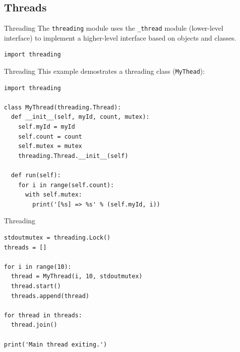 \documentclass[xcolor=dvipsnames, 10pt, presentation,aspectratio=169]{beamer}
\begin{document}
\subsection{Threads}
\label{sec:org062082f}
\begin{frame}[label={sec:org2532113},fragile]{Threading}
 The \texttt{threading} module uses the \texttt{\_thread} module (lower-level interface)
to implement a higher-level interface based on objects and classes.

\lstset{language=Python,label= ,caption= ,captionpos=b,numbers=none}
\begin{lstlisting}
import threading
\end{lstlisting}
\end{frame}
\begin{frame}[label={sec:orgc71523b},fragile]{Threading}
 This example demostrates a threading class (\texttt{MyThead}):
\lstset{language=Python,label= ,caption= ,captionpos=b,numbers=none}
\begin{lstlisting}
import threading

class MyThread(threading.Thread):
  def __init__(self, myId, count, mutex):
    self.myId = myId
    self.count = count
    self.mutex = mutex
    threading.Thread.__init__(self)

  def run(self):
    for i in range(self.count):
      with self.mutex:
        print('[%s] => %s' % (self.myId, i))
\end{lstlisting}
\end{frame}
\begin{frame}[label={sec:org1fef440},fragile]{Threading}
 \lstset{language=Python,label= ,caption= ,captionpos=b,numbers=none}
\begin{lstlisting}
stdoutmutex = threading.Lock()
threads = []

for i in range(10):
  thread = MyThread(i, 10, stdoutmutex)
  thread.start()
  threads.append(thread)

for thread in threads:
  thread.join()

print('Main thread exiting.')
\end{lstlisting}
\end{frame}
\end{document}
